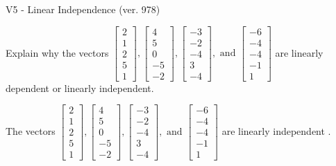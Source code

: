 \begin{exercise}
  \begin{exerciseTitle}V5 - Linear Independence (ver. 978)\end{exerciseTitle}
  \begin{exerciseStatement}
    Explain why the vectors \(\left[\begin{array}{r}
2 \\
1 \\
2 \\
5 \\
1
\end{array}\right] , \left[\begin{array}{r}
4 \\
5 \\
0 \\
-5 \\
-2
\end{array}\right] , \left[\begin{array}{r}
-3 \\
-2 \\
-4 \\
3 \\
-4
\end{array}\right] , \text{ and } \left[\begin{array}{r}
-6 \\
-4 \\
-4 \\
-1 \\
1
\end{array}\right]\) are linearly dependent or linearly independent.	


  \end{exerciseStatement}
  \begin{exerciseAnswer}
   The vectors \(\left[\begin{array}{r}
2 \\
1 \\
2 \\
5 \\
1
\end{array}\right] , \left[\begin{array}{r}
4 \\
5 \\
0 \\
-5 \\
-2
\end{array}\right] , \left[\begin{array}{r}
-3 \\
-2 \\
-4 \\
3 \\
-4
\end{array}\right] , \text{ and } \left[\begin{array}{r}
-6 \\
-4 \\
-4 \\
-1 \\
1
\end{array}\right]\) are 
  	 linearly independent  .
  


  \end{exerciseAnswer}
\end{exercise}